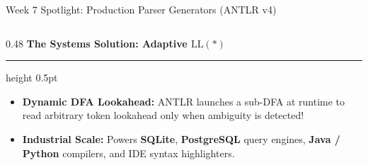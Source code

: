 \documentclass[aspectratio=169, 10pt]{beamer}
\newcommand{\colheader}[1]{%
  {\noindent\footnotesize\bfseries\color{gimpanavy}#1}%
  \vspace{0.03cm}%
  {\color{gimpanavy!30}\hrule height 0.5pt}%
  \vspace{0.08cm}%
}
\begin{document}
\begin{frame}{Week 7 Spotlight: Production Parser Generators (ANTLR v4)}
\begin{columns}[T]
    \begin{column}{0.48\textwidth}
      \colheader{The Systems Solution: Adaptive $\text{LL}(*)$}
      \begin{tcolorbox}[examplecard, top=3pt, bottom=3pt]
        \begin{itemize}\setlength{\itemsep}{2.5pt}\footnotesize
          \item \textbf{Dynamic DFA Lookahead:} ANTLR launches a sub-DFA at runtime to read arbitrary token lookahead only when ambiguity is detected!
          \item \textbf{Industrial Scale:} Powers \textbf{SQLite}, \textbf{PostgreSQL} query engines, \textbf{Java / Python} compilers, and IDE syntax highlighters.
        \end{itemize}
      \end{tcolorbox}
    \end{column}
  \end{columns}
\end{frame}
\end{document}
